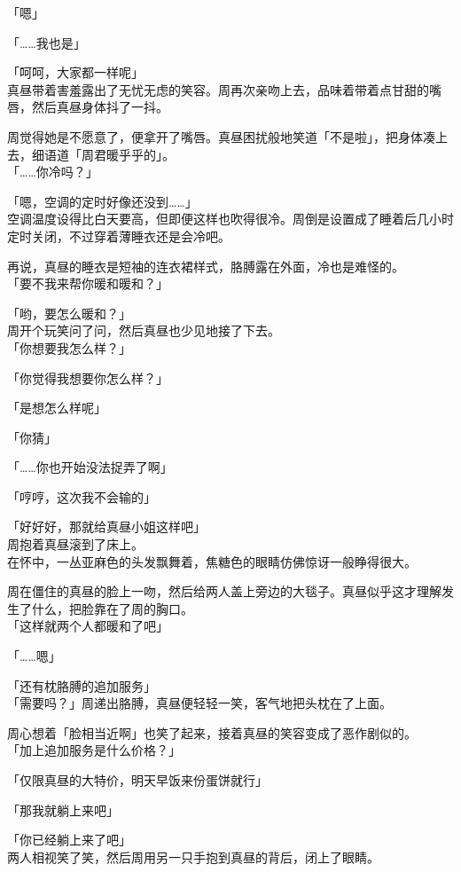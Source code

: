 「嗯」

「……我也是」

「呵呵，大家都一样呢」\\

真昼带着害羞露出了无忧无虑的笑容。周再次亲吻上去，品味着带着点甘甜的嘴唇，然后真昼身体抖了一抖。

周觉得她是不愿意了，便拿开了嘴唇。真昼困扰般地笑道「不是啦」，把身体凑上去，细语道「周君暖乎乎的」。\\

「……你冷吗？」

「嗯，空调的定时好像还没到……」\\

空调温度设得比白天要高，但即便这样也吹得很冷。周倒是设置成了睡着后几小时定时关闭，不过穿着薄睡衣还是会冷吧。

再说，真昼的睡衣是短袖的连衣裙样式，胳膊露在外面，冷也是难怪的。\\

「要不我来帮你暖和暖和？」

「哟，要怎么暖和？」\\

周开个玩笑问了问，然后真昼也少见地接了下去。\\

「你想要我怎么样？」

「你觉得我想要你怎么样？」

「是想怎么样呢」

「你猜」

「……你也开始没法捉弄了啊」

「哼哼，这次我不会输的」

「好好好，那就给真昼小姐这样吧」\\

周抱着真昼滚到了床上。\\

在怀中，一丛亚麻色的头发飘舞着，焦糖色的眼睛仿佛惊讶一般睁得很大。

周在僵住的真昼的脸上一吻，然后给两人盖上旁边的大毯子。真昼似乎这才理解发生了什么，把脸靠在了周的胸口。\\

「这样就两个人都暖和了吧」

「……嗯」

「还有枕胳膊的追加服务」\\

「需要吗？」周递出胳膊，真昼便轻轻一笑，客气地把头枕在了上面。

周心想着「脸相当近啊」也笑了起来，接着真昼的笑容变成了恶作剧似的。\\

「加上追加服务是什么价格？」

「仅限真昼的大特价，明天早饭来份蛋饼就行」

「那我就躺上来吧」

「你已经躺上来了吧」\\

两人相视笑了笑，然后周用另一只手抱到真昼的背后，闭上了眼睛。
